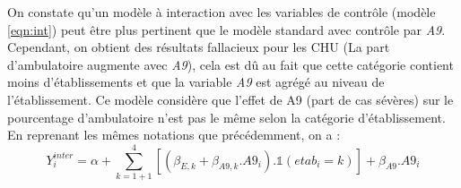 \newpage


On constate qu'un modèle à interaction avec les variables de contrôle (modèle \ref{eqn:int}) peut être plus pertinent que le modèle standard avec contrôle par \textit{A9}. Cependant, on obtient des résultats fallacieux pour les CHU (La part d'ambulatoire augmente avec \textit{A9}), cela est dû au fait que cette catégorie contient moins d'établissements et que la variable \textit{A9} est agrégé au niveau de l'établissement. Ce modèle considère que l'effet de A9 (part de cas sévères) sur le pourcentage d'ambulatoire n'est pas le même selon la catégorie d'établissement. En reprenant les mêmes notations que précédemment, on a :\\

\begin{equation}\label{eqn:int}
    Y^{inter}_i = \alpha + \sum_{k=1+1}^{4}[(\beta_{E,k}+ \beta_{A9,k}.A9_i).\mathbb{1}(etab_i=k)] + \beta_{A9}.A9_i
\end{equation}


